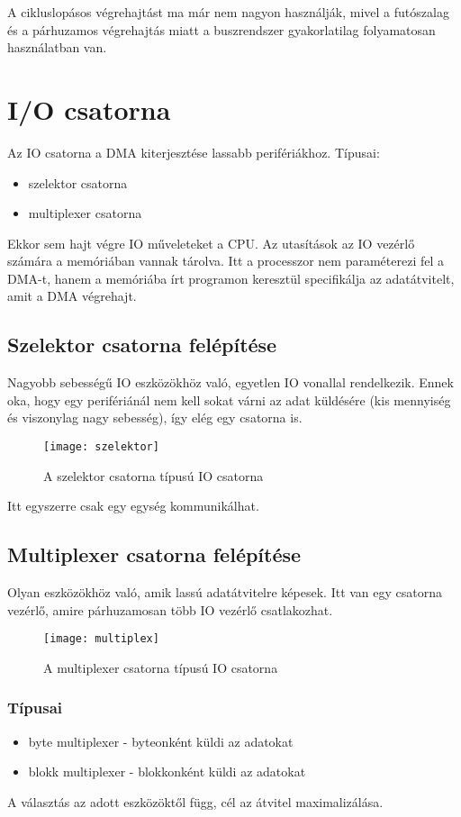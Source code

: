 A cikluslopásos végrehajtást ma már nem nagyon használják, mivel a futószalag és a párhuzamos végrehajtás miatt a buszrendszer gyakorlatilag folyamatosan használatban van.

\section{I/O csatorna}
Az IO csatorna a DMA kiterjesztése lassabb perifériákhoz.
Típusai:
\begin{itemize}
    \item szelektor csatorna
    \item multiplexer csatorna
\end{itemize}
Ekkor sem hajt végre IO műveleteket a CPU.
Az utasítások az IO vezérlő számára a memóriában vannak tárolva.
Itt a processzor nem paraméterezi fel a DMA-t, hanem a memóriába írt programon keresztül specifikálja az adatátvitelt, amit a DMA végrehajt.

\subsection{Szelektor csatorna felépítése}
Nagyobb sebességű IO eszközökhöz való, egyetlen IO vonallal rendelkezik.
Ennek oka, hogy egy perifériánál nem kell sokat várni az adat küldésére (kis mennyiség és viszonylag nagy sebesség), így elég egy csatorna is.
\begin{figure}[H]
    \texttt{[image: szelektor]}
    \centering
    \caption{A szelektor csatorna típusú IO csatorna}
    \label{fig:szelektor}
\end{figure}
Itt egyszerre csak egy egység kommunikálhat.

\subsection{Multiplexer csatorna felépítése}
Olyan eszközökhöz való, amik lassú adatátvitelre képesek.
Itt van egy csatorna vezérlő, amire párhuzamosan több IO vezérlő csatlakozhat.
\begin{figure}[H]
    \texttt{[image: multiplex]}
    \centering
    \caption{A multiplexer csatorna típusú IO csatorna}
    \label{fig:multiplex}
\end{figure}
\subsubsection{Típusai}
\begin{itemize}
    \item byte multiplexer - byteonként küldi az adatokat
    \item blokk multiplexer - blokkonként küldi az adatokat
\end{itemize}
A választás az adott eszközöktől függ, cél az átvitel maximalizálása.